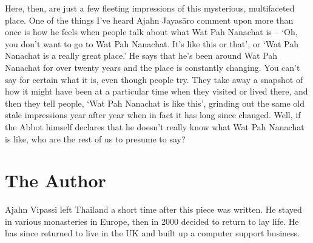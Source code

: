 Here, then, are just a few fleeting impressions of this mysterious, 
multifaceted place. One of the things I've heard Ajahn Jayasāro comment
upon more than once is how he feels when people talk about what Wat Pah
Nanachat is -- `Oh, you don't want to go to Wat Pah Nanachat. It's like
this or that', or `Wat Pah Nanachat is a really great place.' He says
that he's been around Wat Pah Nanachat for over twenty years and the
place is constantly changing. You can't say for certain what it is, even
though people try. They take away a snapshot of how it might have been
at a particular time when they visited or lived there, and then they
tell people, `Wat Pah Nanachat is like this', grinding out the same old
stale impressions year after year when in fact it has long since
changed. Well, if the Abbot himself declares that he doesn't really know
what Wat Pah Nanachat is like, who are the rest of us to presume to say? 

\dividerRule

\section{The Author}

Ajahn Vipassi left Thailand a short time after this piece was
written. He stayed in various monasteries in Europe, then in 2000
decided to return to lay life. He has since returned to live in the UK
and built up a computer support business.

